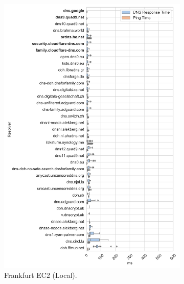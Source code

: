 \begin{figure}[t!]
\begin{subfigure}[b]{0.4\textwidth}
\includegraphics[width=\textwidth]{figures/frankfurt_eur.png}
    \caption{Frankfurt EC2 (Local).}
\label{fig:subfigb}
\end{subfigure}
%
\begin{subfigure}[b]{0.4\textwidth}

\end{subfigure}
\end{figure}

